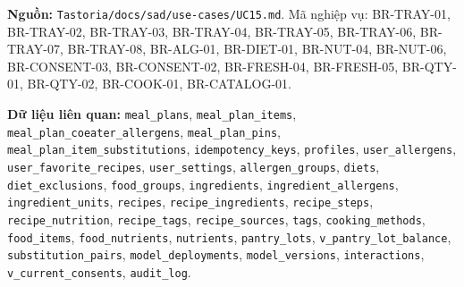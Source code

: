 \textbf{Nguồn:} {\small\texttt{Tastoria/\allowbreak{}\allowbreak{}docs/\allowbreak{}\allowbreak{}sad/\allowbreak{}\allowbreak{}use-\allowbreak{}cases/\allowbreak{}\allowbreak{}UC15.\allowbreak{}md}}. Mã nghiệp vụ: BR-\allowbreak{}TRAY-\allowbreak{}01, BR-\allowbreak{}TRAY-\allowbreak{}02, BR-\allowbreak{}TRAY-\allowbreak{}03, BR-\allowbreak{}TRAY-\allowbreak{}04, BR-\allowbreak{}TRAY-\allowbreak{}05, BR-\allowbreak{}TRAY-\allowbreak{}06, BR-\allowbreak{}TRAY-\allowbreak{}07, BR-\allowbreak{}TRAY-\allowbreak{}08, BR-\allowbreak{}ALG-\allowbreak{}01, BR-\allowbreak{}DIET-\allowbreak{}01, BR-\allowbreak{}NUT-\allowbreak{}04, BR-\allowbreak{}NUT-\allowbreak{}06, BR-\allowbreak{}CONSENT-\allowbreak{}03, BR-\allowbreak{}CONSENT-\allowbreak{}02, BR-\allowbreak{}FRESH-\allowbreak{}04, BR-\allowbreak{}FRESH-\allowbreak{}05, BR-\allowbreak{}QTY-\allowbreak{}01, BR-\allowbreak{}QTY-\allowbreak{}02, BR-\allowbreak{}COOK-\allowbreak{}01, BR-\allowbreak{}CATALOG-\allowbreak{}01.

\textbf{Dữ liệu liên quan:} {\small\texttt{meal\_\allowbreak{}\allowbreak{}plans}}, {\small\texttt{meal\_\allowbreak{}\allowbreak{}plan\_\allowbreak{}\allowbreak{}items}}, {\small\texttt{meal\_\allowbreak{}\allowbreak{}plan\_\allowbreak{}\allowbreak{}coeater\_\allowbreak{}\allowbreak{}allergens}}, {\small\texttt{meal\_\allowbreak{}\allowbreak{}plan\_\allowbreak{}\allowbreak{}pins}}, {\small\texttt{meal\_\allowbreak{}\allowbreak{}plan\_\allowbreak{}\allowbreak{}item\_\allowbreak{}\allowbreak{}substitutions}}, {\small\texttt{idempotency\_\allowbreak{}\allowbreak{}keys}}, {\small\texttt{profiles}}, {\small\texttt{user\_\allowbreak{}\allowbreak{}allergens}}, {\small\texttt{user\_\allowbreak{}\allowbreak{}favorite\_\allowbreak{}\allowbreak{}recipes}}, {\small\texttt{user\_\allowbreak{}\allowbreak{}settings}}, {\small\texttt{allergen\_\allowbreak{}\allowbreak{}groups}}, {\small\texttt{diets}}, {\small\texttt{diet\_\allowbreak{}\allowbreak{}exclusions}}, {\small\texttt{food\_\allowbreak{}\allowbreak{}groups}}, {\small\texttt{ingredients}}, {\small\texttt{ingredient\_\allowbreak{}\allowbreak{}allergens}}, {\small\texttt{ingredient\_\allowbreak{}\allowbreak{}units}}, {\small\texttt{recipes}}, {\small\texttt{recipe\_\allowbreak{}\allowbreak{}ingredients}}, {\small\texttt{recipe\_\allowbreak{}\allowbreak{}steps}}, {\small\texttt{recipe\_\allowbreak{}\allowbreak{}nutrition}}, {\small\texttt{recipe\_\allowbreak{}\allowbreak{}tags}}, {\small\texttt{recipe\_\allowbreak{}\allowbreak{}sources}}, {\small\texttt{tags}}, {\small\texttt{cooking\_\allowbreak{}\allowbreak{}methods}}, {\small\texttt{food\_\allowbreak{}\allowbreak{}items}}, {\small\texttt{food\_\allowbreak{}\allowbreak{}nutrients}}, {\small\texttt{nutrients}}, {\small\texttt{pantry\_\allowbreak{}\allowbreak{}lots}}, {\small\texttt{v\_\allowbreak{}\allowbreak{}pantry\_\allowbreak{}\allowbreak{}lot\_\allowbreak{}\allowbreak{}balance}}, {\small\texttt{substitution\_\allowbreak{}\allowbreak{}pairs}}, {\small\texttt{model\_\allowbreak{}\allowbreak{}deployments}}, {\small\texttt{model\_\allowbreak{}\allowbreak{}versions}}, {\small\texttt{interactions}}, {\small\texttt{v\_\allowbreak{}\allowbreak{}current\_\allowbreak{}\allowbreak{}consents}}, {\small\texttt{audit\_\allowbreak{}\allowbreak{}log}}.

